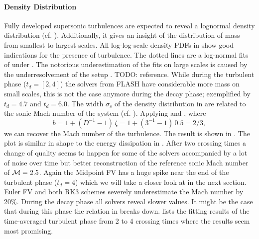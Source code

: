 \paragraph{Density Distribution}
Fully developed supersonic turbulences are expected to reveal a lognormal
density distribution (cf. ). Additionally, it gives
an insight of the distribution of mass from smallest to largest scales.
All log-log-scale density PDFs in 
show good indications for the presence of turbulence. The dotted lines are a
log-normal fits of  under . The notorious
underestimation of the fits on large scales is caused by the underresolvement
of the setup . TODO: reference. While during the turbulent phase
($t_d = [2,4]$) the solvers from FLASH have considerable more mass on small
scales, this is not the case anymore during the decay phase; exemplified by
$t_d = 4.7$ and $t_d = 6.0$.
The width $\sigma_s$ of the density distribution in
 are related to the sonic Mach
number of the system (cf. ). Applying
 and , where
\begin{equation}
b = 1 + (D^{-1} - 1) \, \zeta = 1 + (3^{-1} - 1) \, 0.5 = 2/3,
\end{equation}
we can recover the Mach number of the turbulence. The result is shown in
. The plot is similar in shape to
the energy dissipation in .
After two crossing times a change of quality seems to happen for some of the
solvers accompanied by a lot of noise over time but better reconstruction of
the reference sonic Mach number of $\mathcal{M} = 2.5$. Again the Midpoint FV has a huge
spike near the end of the turbulent  phase ($t_d = 4$) which we will take a closer
look at in the next section. Euler FV and both RK3 schemes severely
underestimate the Mach number by 20\%. During the decay phase all solvers
reveal slower values. It might be the case that during this phase the relation
in  breaks down.  lists the fitting results
of the time-averaged turbulent phase from 2 to 4 crossing times where the results
seem most promising.

